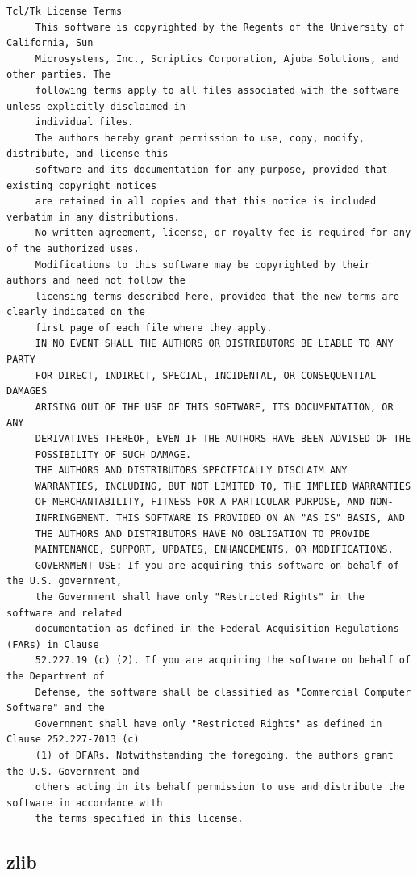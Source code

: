 \begin{lstlisting}[basicstyle=\ttfamily\footnotesize,breaklines=true]
     Tcl/Tk License Terms
     This software is copyrighted by the Regents of the University of California, Sun
     Microsystems, Inc., Scriptics Corporation, Ajuba Solutions, and other parties. The
     following terms apply to all files associated with the software unless explicitly disclaimed in
     individual files.
     The authors hereby grant permission to use, copy, modify, distribute, and license this
     software and its documentation for any purpose, provided that existing copyright notices
     are retained in all copies and that this notice is included verbatim in any distributions.
     No written agreement, license, or royalty fee is required for any of the authorized uses.
     Modifications to this software may be copyrighted by their authors and need not follow the
     licensing terms described here, provided that the new terms are clearly indicated on the
     first page of each file where they apply.
     IN NO EVENT SHALL THE AUTHORS OR DISTRIBUTORS BE LIABLE TO ANY PARTY
     FOR DIRECT, INDIRECT, SPECIAL, INCIDENTAL, OR CONSEQUENTIAL DAMAGES
     ARISING OUT OF THE USE OF THIS SOFTWARE, ITS DOCUMENTATION, OR ANY
     DERIVATIVES THEREOF, EVEN IF THE AUTHORS HAVE BEEN ADVISED OF THE
     POSSIBILITY OF SUCH DAMAGE.
     THE AUTHORS AND DISTRIBUTORS SPECIFICALLY DISCLAIM ANY
     WARRANTIES, INCLUDING, BUT NOT LIMITED TO, THE IMPLIED WARRANTIES
     OF MERCHANTABILITY, FITNESS FOR A PARTICULAR PURPOSE, AND NON-
     INFRINGEMENT. THIS SOFTWARE IS PROVIDED ON AN "AS IS" BASIS, AND
     THE AUTHORS AND DISTRIBUTORS HAVE NO OBLIGATION TO PROVIDE
     MAINTENANCE, SUPPORT, UPDATES, ENHANCEMENTS, OR MODIFICATIONS.
     GOVERNMENT USE: If you are acquiring this software on behalf of the U.S. government,
     the Government shall have only "Restricted Rights" in the software and related
     documentation as defined in the Federal Acquisition Regulations (FARs) in Clause
     52.227.19 (c) (2). If you are acquiring the software on behalf of the Department of
     Defense, the software shall be classified as "Commercial Computer Software" and the
     Government shall have only "Restricted Rights" as defined in Clause 252.227-7013 (c)
     (1) of DFARs. Notwithstanding the foregoing, the authors grant the U.S. Government and
     others acting in its behalf permission to use and distribute the software in accordance with
     the terms specified in this license.
\end{lstlisting}

\subsection{zlib}
